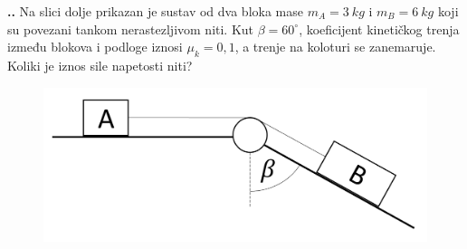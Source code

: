 

\noindent 
\textbf{
\thecjelina.\thezadatak.}
Na slici dolje prikazan je sustav od dva bloka mase $m_A=3\ kg$ i $m_B=6\ kg$ koji su povezani tankom nerastezljivom niti. Kut $\beta=60^\circ $, koeficijent kinetičkog trenja između blokova i podloge iznosi $\mu_k=0,1$, a trenje na koloturi se zanemaruje. Koliki je iznos sile napetosti niti?
\begin{figure}[ht]%
  \begin{center}
    \includegraphics[scale=0.20]{../03_Dinamika_materijalne_tocke/Zadatak_D735.png}
  \end{center}
\end{figure}
